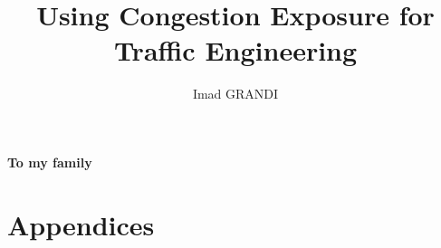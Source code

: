 \documentclass[mres]{ucl_thesis}
\title{Using Congestion Exposure for Traffic Engineering}
\author{Imad GRANDI}
\begin{document}
\maketitle

\clearpage
\clearpage
\fontsize{12}{15}
\selectfont
\begin{center}
\textbf{}
\end{center}
\clearpage
\begin{center}
\textbf{To my family}
\end{center}




\setcounter{tocdepth}{2}
\tableofcontents
\listoffigures

\cleardoublepage




















\chapter{Appendices}
%

\end{document}
